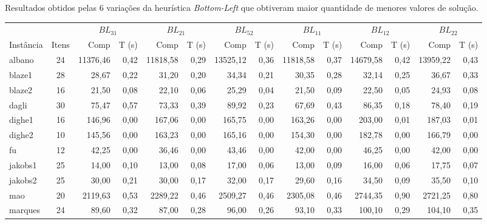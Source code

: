 \documentclass{article}
\newcommand{\lgray}{\cellcolor{lightgray}}
\begin{document}
\begin{adjustwidth}{-2cm}{-2.5 cm}\centering\begin{threeparttable}[!htb]\centering
\renewcommand{\arraystretch}{1.2}%
    \caption{Resultados obtidos pelas 6 variações da heurística {\it Bottom-Left} que obtiveram maior quantidade de menores valores de solução.}
    \scriptsize{
        \begin{tabular}{|l|c|rr|rr|rr|rr|rr|rr|}\hline
        \multicolumn{1}{|c|}{} & \multicolumn{1}{c|}{} &  \multicolumn{2}{c|}{$BL_{31}$} & \multicolumn{2}{c|}{$BL_{21}$} & \multicolumn{2}{c|}{$BL_{52}$} &
        \multicolumn{2}{c|}{$BL_{11}$} &
        \multicolumn{2}{c|}{$BL_{12}$} &
        \multicolumn{2}{c|}{$BL_{22}$}\\
            Instância &Itens &Comp &T (s) &Comp &T (s) &Comp &T (s) &Comp &T (s) &Comp &T (s) &Comp &T (s) \\\hline
            albano &24  &\lgray11376,46 &0,42  &11818,58 &0,29  &13525,12 &0,36  &11818,58 &0,37  &14679,58 &0,42  &13959,22 &0,43 \\
            blaze1 &28  &\lgray28,67 &0,22  &31,20 &0,20  &34,34 &0,21  &30,35 &0,28  &32,14 &0,25  &36,67 &0,33 \\
            blaze2 &16  &\lgray21,50 &0,08  &22,10 &0,06  &25,29 &0,04  &\lgray21,50 &0,09  &22,50 &0,05  &24,93 &0,08 \\
            dagli &30  &75,47 &0,57  &73,33 &0,39  &89,92 &0,23  &\lgray67,69 &0,43  &86,35 &0,18  &78,40 &0,19 \\
            dighe1 &16  &\lgray146,96 &0,00  &167,06 &0,00  &165,75 &0,00  &163,26 &0,00  &203,00 &0,01  &187,03 &0,01 \\
            dighe2 &10  &\lgray145,56 &0,00  &163,23 &0,00  &165,16 &0,00  &154,30 &0,00  &182,78 &0,00  &166,79 &0,00 \\
            fu &12  &42,25 &0,00  &\lgray36,46 &0,00  &43,46 &0,00  &42,00 &0,00  &46,25 &0,00  &42,00 &0,00 \\
            jakobs1 &25  &14,00 &0,10  &\lgray13,00 &0,08  &17,00 &0,06  &\lgray13,00 &0,09  &16,00 &0,06  &17,75 &0,07 \\
            jakobs2 &25  &30,00 &0,21  &30,00 &0,17  &32,00 &0,17  &29,60 &0,16  &34,50 &0,09  &35,50 &0,10 \\
            mao &20  &\lgray2119,63 &0,53  &2289,22 &0,46  &2509,27 &0,46  &2305,08 &0,46  &2744,35 &0,90  &2721,25 &0,80 \\
            marques &24  &89,60 &0,32  &\lgray87,00 &0,28  &96,00 &0,26  &93,10 &0,33  &100,10 &0,29  &104,10 &0,35 \\

\end{tabular}}
\end{threeparttable}
\end{adjustwidth}
\end{document}

